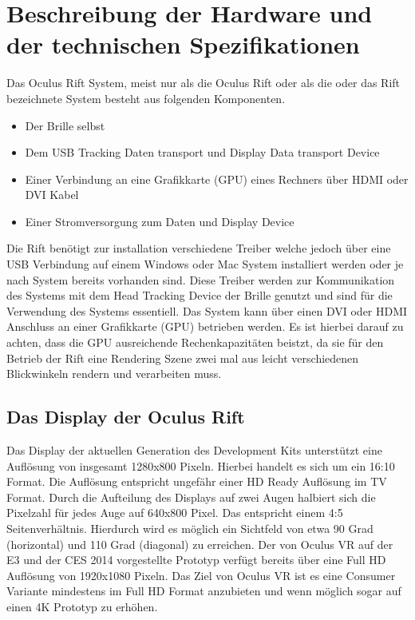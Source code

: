 \documentclass[pagesize, paper=a4, fontsize=12pt,titlepage=true, headings=small, headnosepline, abstractoff, liststotoc, nochapterprefix, plainheadsepline]{scrreprt}
\begin{document}
\section{Beschreibung der Hardware und der technischen Spezifikationen}
Das Oculus Rift System, meist nur als die Oculus Rift oder als die oder das Rift bezeichnete System besteht aus folgenden Komponenten.
\begin{itemize}
\item Der Brille selbst
\item Dem USB Tracking Daten transport und Display Data transport Device
\item Einer Verbindung an eine Grafikkarte (GPU) eines Rechners über HDMI oder DVI Kabel
\item Einer Stromversorgung zum Daten und Display Device
\end{itemize}
Die Rift benötigt zur installation verschiedene Treiber welche jedoch über eine USB Verbindung auf einem Windows oder Mac System installiert werden oder je nach System bereits vorhanden sind. Diese Treiber werden zur Kommunikation des Systems mit dem Head Tracking Device der Brille genutzt und sind für die Verwendung des Systems essentiell. Das System kann über einen DVI oder HDMI Anschluss an einer Grafikkarte (GPU) betrieben werden. Es ist hierbei darauf zu achten, dass die GPU ausreichende Rechenkapazitäten beistzt, da sie für den Betrieb der Rift eine Rendering Szene zwei mal aus leicht verschiedenen Blickwinkeln rendern und verarbeiten muss.

\subsection{Das Display der Oculus Rift}
Das Display der aktuellen Generation des Development Kits unterstützt eine Auflösung von insgesamt 1280x800 Pixeln. Hierbei handelt es sich um ein 16:10 Format. Die Auflösung entspricht ungefähr einer HD Ready Auflösung im TV Format. Durch die Aufteilung des Displays auf zwei Augen halbiert sich die Pixelzahl für jedes Auge auf 640x800 Pixel. Das entspricht einem 4:5 Seitenverhältnis. Hierdurch wird es möglich ein Sichtfeld von etwa 90 Grad (horizontal) und 110 Grad (diagonal) zu erreichen. Der von Oculus VR auf der E3 und der CES 2014 vorgestellte Prototyp verfügt bereits über eine Full HD Auflösung von 1920x1080 Pixeln. Das Ziel von Oculus VR ist es eine Consumer Variante mindestens im Full HD Format anzubieten und wenn möglich sogar auf einen 4K Prototyp zu erhöhen.
\end{document}
